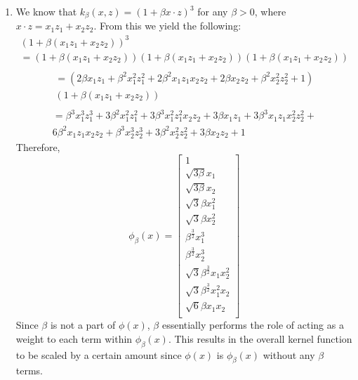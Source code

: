 \documentclass[11pt]{article}
\newcommand{\solution}[1]{{{\color{blue}{\bf Solution:} {#1}}}}
\begin{document}
\begin{enumerate}
\item
\solution{
We know that $ k_\beta(x,z) = (1 + \beta x\cdot z)^3$ for any $\beta > 0$, where $x \cdot z = x_1z_1 + x_2z_2$. From this we yield the following: \\
\begin{multline}
(1 + \beta(x_1z_1 + x_2z_2))^3 \\ = (1 + \beta(x_1z_1 + x_2z_2))(1 + \beta(x_1z_1 + x_2z_2))(1 + \beta(x_1z_1 + x_2z_2)) \\
\end{multline}
\begin{multline}
= (2\beta x_1z_1 + \beta^2x_1^2z_1^2 + 2\beta^2 x_1z_1x_2z_2 + 2\beta x_2z_2 + \beta^2x_2^2z_2^2 + 1)\\(1 + \beta(x_1z_1 + x_2z_2)) \\
\end{multline}
\begin{multline}
= \beta^3x_1^3z_1^3 + 3\beta^2x_1^2z_1^2 + 3\beta^3x_1^2z_1^2x_2z_2 + 3\beta x_1z_1+ 3\beta^3x_1z_1x_2^2z_2^2 + \\ 6\beta^2x_1z_1x_2z_2 + \beta^3x_2^3z_2^3 + 3\beta^2x_2^2z_2^2 + 3\beta x_2z_2 + 1 
\end{multline}
Therefore,
\begin{equation}
\phi_\beta(x) = \begin{bmatrix}
1 \\
\sqrt{3\beta}x_1 \\
\sqrt{3\beta}x_2 \\
\sqrt{3}\beta x_1^2 \\
\sqrt{3}\beta x_2^2 \\
\beta^{\frac{3}{2}}x_1^3 \\
\beta^{\frac{3}{2}}x_2^3 \\
\sqrt{3}\beta^{\frac{3}{2}}x_1x_2^2 \\
\sqrt{3}\beta^{\frac{3}{2}}x_1^2x_2 \\
\sqrt{6}\beta x_1 x_2\\
\end{bmatrix}
\end{equation}
Since $\beta$ is not a part of $\phi(x)$, $\beta$ essentially performs the role of acting as a weight to each term within $\phi_\beta(x)$. This results in the overall kernel function to be scaled by a certain amount since $\phi(x)$ is $\phi_\beta(x)$ without any $\beta$ terms. 
}
\end{enumerate}
\newpage
\end{document}
